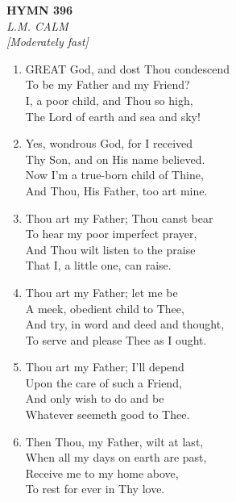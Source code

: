 \newpage
\begin{center}
    {\Large \textbf{HYMN 396}}
    \\
    \textit{L.M. CALM}
    \\
    \textit{\small [Moderately fast]}
\end{center}
\vspace{1em}

\begin{enumerate}
    \item GREAT God, and dost Thou condescend \\
        To be my Father and my Friend? \\
        I, a poor child, and Thou so high, \\
        The Lord of earth and sea and sky!

    \item Yes, wondrous God, for I received \\
        Thy Son, and on His name believed. \\
        Now I'm a true-born child of Thine, \\
        And Thou, His Father, too art mine.

    \item Thou art my Father; Thou canst bear \\
        To hear my poor imperfect prayer, \\
        And Thou wilt listen to the praise \\
        That I, a little one, can raise.

    \item Thou art my Father; let me be \\
        A meek, obedient child to Thee, \\
        And try, in word and deed and thought, \\
        To serve and please Thee as I ought.

    \item Thou art my Father; I'll depend \\
        Upon the care of such a Friend, \\
        And only wish to do and be \\
        Whatever seemeth good to Thee.

    \item Then Thou, my Father, wilt at last, \\
        When all my days on earth are past, \\
        Receive me to my home above, \\
        To rest for ever in Thy love.

\end{enumerate}

